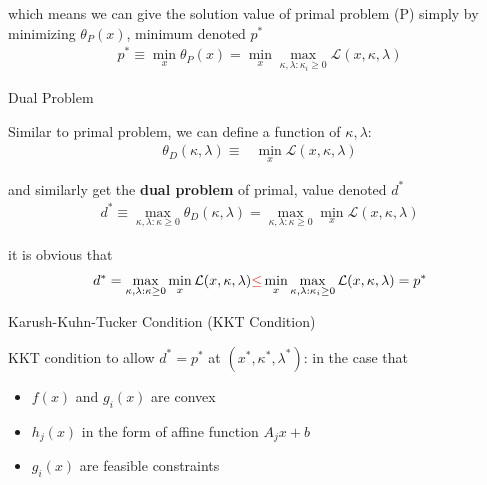     which means we can give the solution value of primal problem (P) simply by minimizing $ \theta _P(x) $, minimum denoted $ p^* $
    \begin{align}
        p^* \equiv \mathop{\min}\limits_{x}\theta _P(x)=\mathop{\min}\limits_{x}  \mathop{\max}\limits_{\kappa ,\lambda :\kappa _i\geq 0}\mathcal{L}(x,\kappa ,\lambda )
    \end{align}
    
\begin{point}
    Dual Problem
\end{point}

    Similar to primal problem, we can define a function of $ \kappa ,\lambda  $:
\begin{align}
    \theta _D(\kappa ,\lambda )\equiv&\mathop{\min}\limits_{x} \mathcal{L}(x,\kappa ,\lambda )
\end{align}

    and similarly get the \textbf{dual problem} of primal, value denoted $ d^* $
\begin{align}
    d^*\equiv\max_{\kappa ,\lambda :\kappa \geq 0}\theta _D(\kappa ,\lambda )=\max_{\kappa ,\lambda :\kappa \geq 0}\mathop{\min}\limits_{x} \mathcal{L}(x,\kappa ,\lambda )
\end{align} 
    
    it is obvious that 
    \begin{align}
        d^*= \max_{\kappa ,\lambda :\kappa \geq 0}\mathop{\min}\limits_{x} \mathcal{L}(x,\kappa ,\lambda ){\color{red}\leq }\mathop{\min}\limits_{x}  \mathop{\max}\limits_{\kappa ,\lambda :\kappa _i\geq 0}\mathcal{L}(x,\kappa ,\lambda )=p^*
    \end{align}
    
\begin{point}
    Karush-Kuhn-Tucker Condition (KKT Condition)
\end{point}

    KKT condition to allow $ d^*=p^* $ at $ (x^*,\kappa ^*,\lambda ^*) $: in the case that
\begin{itemize}[topsep=2pt,itemsep=0pt]
    \item $ f(x) $ and $ g_i(x) $ are convex
    \item $ h_j(x) $ in the form of affine function $ A_jx+b $
    \item $ g_i(x) $ are feasible constraints
\end{itemize}

